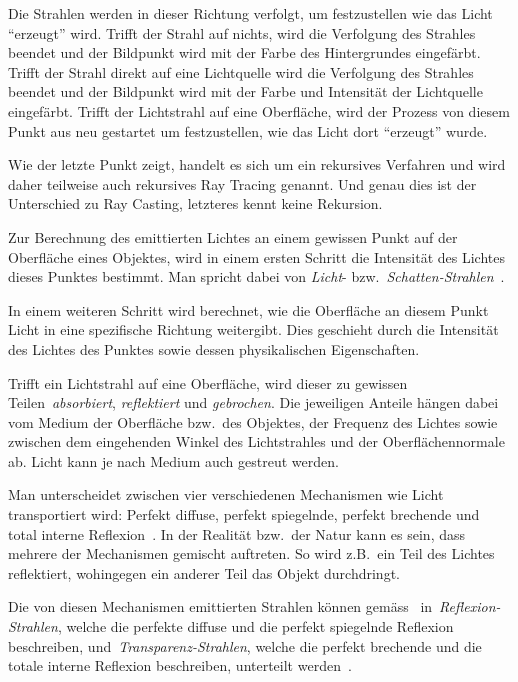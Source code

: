 Die Strahlen werden in dieser Richtung verfolgt, um festzustellen wie
das Licht ``erzeugt'' wird. Trifft der Strahl auf nichts, wird die
Verfolgung des Strahles beendet und der Bildpunkt wird mit der Farbe des
Hintergrundes eingefärbt. Trifft der Strahl direkt auf eine Lichtquelle
wird die Verfolgung des Strahles beendet und der Bildpunkt wird mit der
Farbe und Intensität der Lichtquelle eingefärbt.  Trifft der Lichtstrahl
auf eine Oberfläche, wird der Prozess von diesem Punkt aus neu gestartet
um festzustellen, wie das Licht dort ``erzeugt'' wurde.

Wie der letzte Punkt zeigt, handelt es sich um ein rekursives Verfahren
und wird daher teilweise auch rekursives Ray Tracing genannt. Und genau
dies ist der Unterschied zu Ray Casting, letzteres kennt keine
Rekursion.

Zur Berechnung des emittierten Lichtes an einem gewissen Punkt auf der
Oberfläche eines Objektes, wird in einem ersten Schritt die Intensität
des Lichtes dieses Punktes bestimmt. Man spricht dabei von \textit{Licht}- bzw.\
\textit{Schatten-Strahlen}~\parencite[S. 10]{glassner_introduction_1989}.

In einem weiteren Schritt wird berechnet, wie die Oberfläche an
diesem Punkt Licht in eine spezifische Richtung weitergibt. Dies
geschieht durch die Intensität des Lichtes des Punktes sowie dessen
physikalischen Eigenschaften.

Trifft ein Lichtstrahl auf eine Oberfläche, wird dieser zu gewissen
Teilen~\textit{absorbiert}, \textit{reflektiert} und
\textit{gebrochen}. Die jeweiligen Anteile hängen dabei vom Medium der
Oberfläche bzw.\ des Objektes, der Frequenz des Lichtes sowie zwischen
dem eingehenden Winkel des Lichtstrahles und der Oberflächennormale ab.
Licht kann je nach Medium auch gestreut werden.

Man unterscheidet zwischen vier verschiedenen Mechanismen wie Licht
transportiert wird: Perfekt diffuse, perfekt spiegelnde, perfekt
brechende und total interne
Reflexion~\parencite[S. 130 bis 137]{glassner_introduction_1989}.
In der Realität bzw.\ der Natur kann es sein, dass mehrere der
Mechanismen gemischt auftreten. So wird z.B.\ ein Teil des Lichtes
reflektiert, wohingegen ein anderer Teil das Objekt durchdringt.

Die von diesen Mechanismen emittierten Strahlen können
gemäss~\citeauthor{glassner_introduction_1989}
in~\textit{Reflexion-Strahlen}, welche die perfekte diffuse und die
perfekt spiegelnde Reflexion beschreiben,
und~\textit{Transparenz-Strahlen}, welche die perfekt brechende und die
totale interne Reflexion beschreiben, unterteilt
werden~\parencite[S. 10]{glassner_introduction_1989}.

